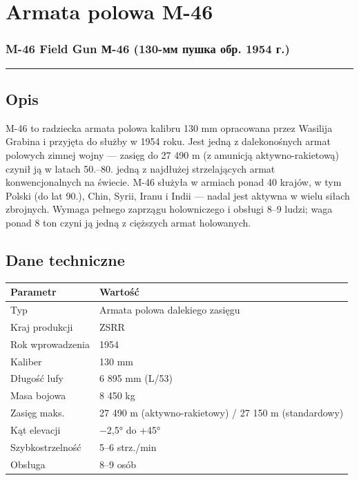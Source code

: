 \documentclass[12pt,openany,oneside]{book}
\begin{document}
\chapter{Armata polowa M-46}\label{armata-polowa-m-46}

\subsection{M-46 Field Gun \textbar{} М-46 (130-мм пушка обр. 1954
г.)}\label{m-46-field-gun-ux43c-46-130-ux43cux43c-ux43fux443ux448ux43aux430-ux43eux431ux440.-1954-ux433.}

\begin{center}\rule{0.5\linewidth}{0.5pt}\end{center}

\section{Opis}\label{opis-18}

M-46 to radziecka armata polowa kalibru 130 mm opracowana przez Wasilija
Grabina i przyjęta do służby w 1954 roku. Jest jedną z dalekonośnych
armat polowych zimnej wojny --- zasięg do 27 490 m (z amunicją
aktywno-rakietową) czynił ją w latach 50.--80. jedną z najdłużej
strzelających armat konwencjonalnych na świecie. M-46 służyła w armiach
ponad 40 krajów, w tym Polski (do lat 90.), Chin, Syrii, Iranu i Indii
--- nadal jest aktywna w wielu siłach zbrojnych. Wymaga pełnego zaprzągu
holowniczego i obsługi 8--9 ludzi; waga ponad 8 ton czyni ją jedną z
cięższych armat holowanych.

\section{Dane techniczne}\label{dane-techniczne-18}

\begin{longtable}[]{@{}ll@{}}
\toprule\noalign{}
Parametr & Wartość \\
\midrule\noalign{}
\endhead
\bottomrule\noalign{}
\endlastfoot
Typ & Armata polowa dalekiego zasięgu \\
Kraj produkcji & ZSRR \\
Rok wprowadzenia & 1954 \\
Kaliber & 130 mm \\
Długość lufy & 6 895 mm (L/53) \\
Masa bojowa & 8 450 kg \\
Zasięg maks. & 27 490 m (aktywno-rakietowy) / 27 150 m (standardowy) \\
Kąt elevacji & −2,5° do +45° \\
Szybkostrzelność & 5--6 strz./min \\
Obsługa & 8--9 osób \\
\end{longtable}
\end{document}
